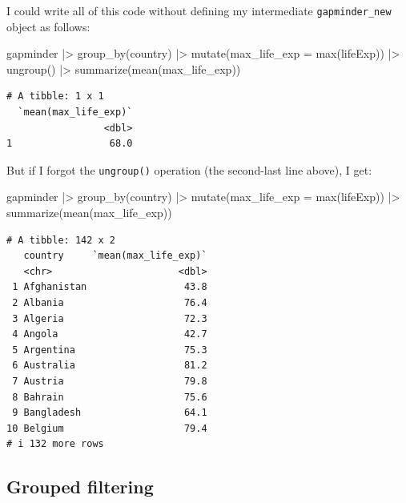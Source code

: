 \documentclass[
  letterpaper,
  DIV=11,
  numbers=noendperiod]{scrreprt}
\newenvironment{Shaded}{\begin{snugshade}}{\end{snugshade}}
\newcommand{\AttributeTok}[1]{\textcolor[rgb]{0.40,0.45,0.13}{#1}}
\newcommand{\FunctionTok}[1]{\textcolor[rgb]{0.28,0.35,0.67}{#1}}
\newcommand{\NormalTok}[1]{\textcolor[rgb]{0.00,0.23,0.31}{#1}}
\newcommand{\SpecialCharTok}[1]{\textcolor[rgb]{0.37,0.37,0.37}{#1}}
\begin{document}
I could write all of this code without defining my intermediate
\texttt{gapminder\_new} object as follows:

\begin{Shaded}
\begin{Highlighting}[]
\NormalTok{gapminder }\SpecialCharTok{|\textgreater{}} 
  \FunctionTok{group\_by}\NormalTok{(country) }\SpecialCharTok{|\textgreater{}}
  \FunctionTok{mutate}\NormalTok{(}\AttributeTok{max\_life\_exp =} \FunctionTok{max}\NormalTok{(lifeExp)) }\SpecialCharTok{|\textgreater{}}
  \FunctionTok{ungroup}\NormalTok{() }\SpecialCharTok{|\textgreater{}}
  \FunctionTok{summarize}\NormalTok{(}\FunctionTok{mean}\NormalTok{(max\_life\_exp))}
\end{Highlighting}
\end{Shaded}

\begin{verbatim}
# A tibble: 1 x 1
  `mean(max_life_exp)`
                 <dbl>
1                 68.0
\end{verbatim}

But if I forgot the \texttt{ungroup()} operation (the second-last line
above), I get:

\begin{Shaded}
\begin{Highlighting}[]
\NormalTok{gapminder }\SpecialCharTok{|\textgreater{}} 
  \FunctionTok{group\_by}\NormalTok{(country) }\SpecialCharTok{|\textgreater{}}
  \FunctionTok{mutate}\NormalTok{(}\AttributeTok{max\_life\_exp =} \FunctionTok{max}\NormalTok{(lifeExp)) }\SpecialCharTok{|\textgreater{}}
  \FunctionTok{summarize}\NormalTok{(}\FunctionTok{mean}\NormalTok{(max\_life\_exp))}
\end{Highlighting}
\end{Shaded}

\begin{verbatim}
# A tibble: 142 x 2
   country     `mean(max_life_exp)`
   <chr>                      <dbl>
 1 Afghanistan                 43.8
 2 Albania                     76.4
 3 Algeria                     72.3
 4 Angola                      42.7
 5 Argentina                   75.3
 6 Australia                   81.2
 7 Austria                     79.8
 8 Bahrain                     75.6
 9 Bangladesh                  64.1
10 Belgium                     79.4
# i 132 more rows
\end{verbatim}

\subsection{Grouped filtering}\label{grouped-filtering}
\end{document}
